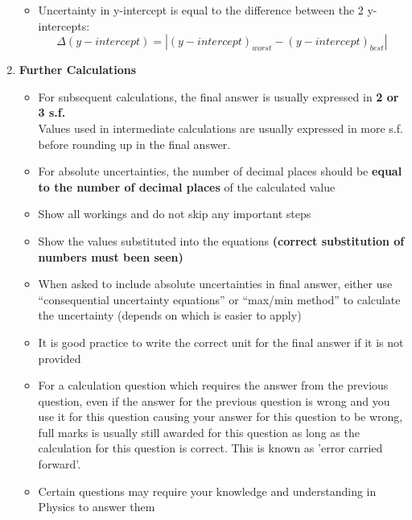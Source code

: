 \documentclass{article}
\begin{document}
\begin{enumerate}
\begin{itemize}
        \item Uncertainty in y-intercept is equal to the difference between the 2 y-intercepts:
        $$\Delta(y-intercept) = |(y-intercept)_{worst} - (y-intercept)_{best}|$$
    \end{itemize}
    \item \textbf{Further Calculations}
\begin{itemize}
    \item For subsequent calculations, the final answer is usually expressed in \textbf{2 or 3 s.f.}\\
    Values used in intermediate calculations are usually expressed in more s.f. before rounding up in the final answer.
    \item For absolute uncertainties, the number of decimal places should be \textbf{equal to the number of decimal places} of the calculated value
    \item Show all workings and do not skip any important steps
    \item Show the values substituted into the equations \textbf{(correct substitution of numbers must been seen)}
    \item When asked to include absolute uncertainties in final answer, either use “consequential uncertainty equations” or “max/min method” to calculate the uncertainty (depends on which is easier to apply)
    \item It is good practice to write the correct unit for the final answer if it is not provided
    \item For a calculation question which requires the answer from the previous question, even if the answer for the previous question is wrong and you use it for this question causing your answer for this question to be wrong, full marks is usually still awarded for this question as long as the calculation for this question is correct. This is known as 'error carried forward'.
    \item Certain questions may require your knowledge and understanding in Physics to answer them

\end{itemize}
\end{enumerate}
\end{document}
